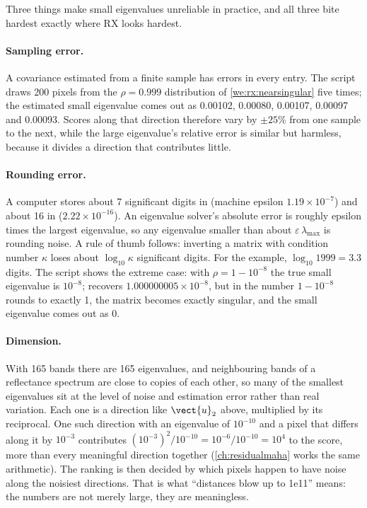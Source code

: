 Three things make small eigenvalues unreliable in practice, and all three bite hardest exactly where
RX looks hardest.

\paragraph{Sampling error.} A covariance estimated from a finite sample has errors in every entry.
The script draws 200 pixels from the $\rho = 0.999$ distribution of \cref{we:rx:nearsingular} five
times\tagC; the estimated small eigenvalue comes out as 0.00102, 0.00080, 0.00107, 0.00097 and
0.00093. Scores along that direction therefore vary by $\pm25\%$ from one sample to the next, while
the large eigenvalue's relative error is similar but harmless, because it divides a direction that
contributes little.

\paragraph{Rounding error.} A computer stores about 7 significant digits in  (machine
epsilon $1.19\times10^{-7}$) and about 16 in  ($2.22\times10^{-16}$). An eigenvalue
solver's absolute error is roughly epsilon times the largest eigenvalue, so any eigenvalue smaller
than about $\varepsilon\,\lambda_{\max}$ is rounding noise. A rule of thumb follows: inverting a
matrix with condition number $\kappa$ loses about $\log_{10}\kappa$ significant digits. For the
example, $\log_{10}1999 = 3.3$ digits. The script shows the extreme case: with $\rho = 1 - 10^{-8}$
the true small eigenvalue is $10^{-8}$;  recovers $1.000000005\times10^{-8}$, but in
 the number $1 - 10^{-8}$ rounds to exactly 1, the matrix becomes exactly singular, and
the small eigenvalue comes out as 0\tagC.

\paragraph{Dimension.} With 165 bands there are 165 eigenvalues, and neighbouring bands of a
reflectance spectrum are close to copies of each other, so many of the smallest eigenvalues sit at the
level of noise and estimation error rather than real variation. Each one is a direction like
$\vect{u}_2$ above, multiplied by its reciprocal. One such direction with an eigenvalue of
$10^{-10}$ and a pixel that differs along it by $10^{-3}$ contributes
$(10^{-3})^2/10^{-10} = 10^{-6}/10^{-10} = 10^{4}$ to the score, more than every meaningful direction
together (\cref{ch:residualmaha} works the same arithmetic). The ranking is then decided by which
pixels happen to have noise along the noisiest directions. That is what ``distances blow up to
1e11'' means: the numbers are not merely large,
they are meaningless.


